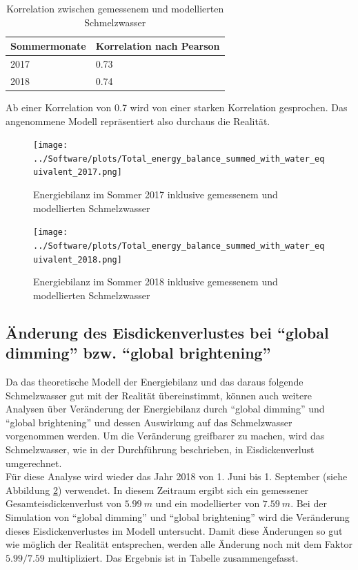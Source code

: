 \documentclass[12pt,a4paper]{article}
\begin{document}
\begin{table}[H]
\centering
{} 
\caption{Korrelation zwischen gemessenem und modellierten Schmelzwasser}
\label{tab:Korrelation zwischen gemessenem und modellierten Schmelzwasser}
\begin{tabular}{|l|l|}
\hline
Sommermonate & Korrelation nach Pearson \\ \hline
2017         & 0.73                     \\ \hline
2018         & 0.74                     \\ \hline
\end{tabular}
\end{table}

Ab einer Korrelation von 0.7 wird von einer starken Korrelation gesprochen. Das angenommene Modell repräsentiert also durchaus die Realität.

\begin{figure}[H]
\centering
\texttt{[image: ../Software/plots/Total\_energy\_balance\_summed\_with\_water\_equivalent\_2017.png]}
\caption{Energiebilanz im Sommer 2017 inklusive gemessenem und modellierten Schmelzwasser}
\label{fig:Energiebilanz im Sommer 2017 inklusive gemessenem und modellierten Schmelzwasser}
\end{figure}

\begin{figure}[H]
\centering
\texttt{[image: ../Software/plots/Total\_energy\_balance\_summed\_with\_water\_equivalent\_2018.png]}
\caption{Energiebilanz im Sommer 2018 inklusive gemessenem und modellierten Schmelzwasser}
\label{fig:Energiebilanz im Sommer 2018 inklusive gemessenem und modellierten Schmelzwasser}
\end{figure}

\subsection{Änderung des Eisdickenverlustes bei ``global dimming'' bzw. ``global brightening''}
Da das theoretische Modell der Energiebilanz und das daraus folgende Schmelzwasser gut mit der Realität übereinstimmt, können auch weitere Analysen über Veränderung der Energiebilanz durch ``global dimming'' und ``global brightening'' und dessen Auswirkung auf das Schmelzwasser vorgenommen werden. Um die Veränderung greifbarer zu machen, wird das Schmelzwasser, wie in der Durchführung beschrieben, in Eisdickenverlust umgerechnet.\\

Für diese Analyse wird wieder das Jahr 2018 von 1. Juni bis 1. September (siehe Abbildung \ref{fig:Energiebilanz im Sommer 2018 inklusive gemessenem und modellierten Schmelzwasser}) verwendet. In diesem Zeitraum ergibt sich ein gemessener Gesamteisdickenverlust von $5.99~m$ und ein modellierter von $7.59~m$. Bei der Simulation von ``global dimming'' und ``global brightening'' wird die Veränderung dieses Eisdickenverlustes im Modell untersucht. Damit diese Änderungen so gut wie möglich der Realität entsprechen, werden alle Änderung noch mit dem Faktor $5.99/7.59$ multipliziert. Das Ergebnis ist in Tabelle zusammengefasst.
\end{document}

